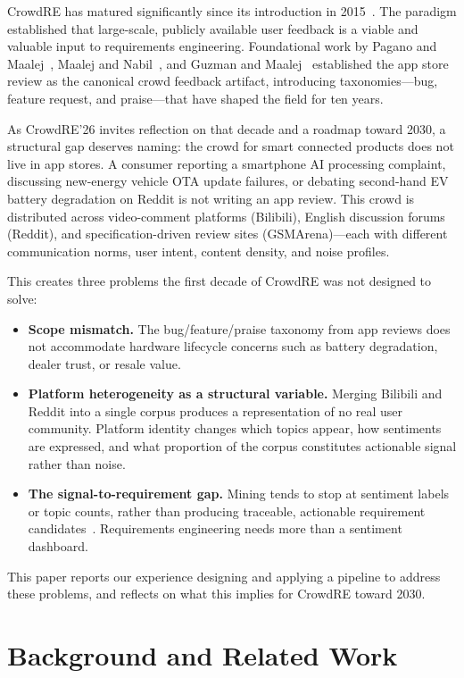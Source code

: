 \documentclass[conference]{IEEEtran}
\begin{document}
CrowdRE has matured significantly since its introduction in 2015~\cite{Groen2017}. The paradigm established that large-scale, publicly available user feedback is a viable and valuable input to requirements engineering. Foundational work by Pagano and Maalej~\cite{Pagano2013}, Maalej and Nabil~\cite{Maalej2015}, and Guzman and Maalej~\cite{Guzman2014} established the app store review as the canonical crowd feedback artifact, introducing taxonomies---bug, feature request, and praise---that have shaped the field for ten years.

As CrowdRE'26 invites reflection on that decade and a roadmap toward 2030, a structural gap deserves naming: the crowd for smart connected products does not live in app stores. A consumer reporting a smartphone AI processing complaint, discussing new-energy vehicle OTA update failures, or debating second-hand EV battery degradation on Reddit is not writing an app review. This crowd is distributed across video-comment platforms (Bilibili), English discussion forums (Reddit), and specification-driven review sites (GSMArena)---each with different communication norms, user intent, content density, and noise profiles.

This creates three problems the first decade of CrowdRE was not designed to solve:
\begin{itemize}
\item \textbf{Scope mismatch.} The bug/feature/praise taxonomy from app reviews does not accommodate hardware lifecycle concerns such as battery degradation, dealer trust, or resale value.
\item \textbf{Platform heterogeneity as a structural variable.} Merging Bilibili and Reddit into a single corpus produces a representation of no real user community. Platform identity changes which topics appear, how sentiments are expressed, and what proportion of the corpus constitutes actionable signal rather than noise.
\item \textbf{The signal-to-requirement gap.} Mining tends to stop at sentiment labels or topic counts, rather than producing traceable, actionable requirement candidates~\cite{Dalpiaz2021}. Requirements engineering needs more than a sentiment dashboard.
\end{itemize}

This paper reports our experience designing and applying a pipeline to address these problems, and reflects on what this implies for CrowdRE toward 2030.

\section{Background and Related Work}
\end{document}
